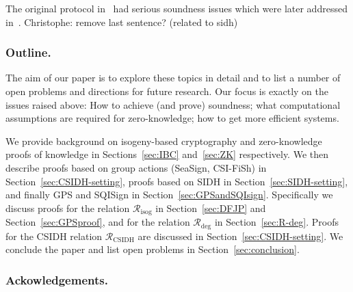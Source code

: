\documentclass{llncs}
\newcommand{\R}[1][]{\ensuremath{\mathcal{R}_{\mathrm{#1}}}}
\newcommand{\comment}[1]{{\color{gray}#1}}
\newcommand{\CP}[1]{\comment{Christophe: #1}}
\begin{document}
The original protocol in~\cite{SIDHjournal} had serious soundness issues which were later addressed in~\cite{DFDGZ21}. \CP{remove last sentence? (related to sidh)}












\subsubsection{Outline.}

The aim of our paper is to explore these topics in detail and to list a number of open problems and directions for future research.
Our focus is exactly on the issues raised above: How to achieve (and prove) soundness; what computational assumptions are required for zero-knowledge; how to get more efficient systems.

We provide background on isogeny-based cryptography and zero-knowledge proofs of knowledge in Sections~\ref{sec:IBC} and~\ref{sec:ZK} respectively. 
%
We then describe proofs based on group actions (SeaSign, CSI-FiSh) in Section~\ref{sec:CSIDH-setting}, proofs based on SIDH in Section~\ref{sec:SIDH-setting}, and finally GPS and SQISign in Section~\ref{sec:GPSandSQIsign}.
%
Specifically we discuss proofs for the relation $ \R[isog] $ in Section~\ref{sec:DFJP} and Section~\ref{sec:GPSproof}, and for the relation $\R[deg]$ in Section~\ref{sec:R-deg}.
Proofs for the CSIDH relation $\R[CSIDH]$ are discussed in Section~\ref{sec:CSIDH-setting}.
%
We conclude the paper and list open problems in Section~\ref{sec:conclusion}.


\subsubsection{Ackowledgements.}
\end{document}
